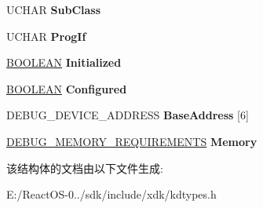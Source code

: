 \begin{DoxyCompactItemize}
U\+C\+H\+AR {\bfseries Sub\+Class}
\item 
\mbox{\label{struct___d_e_b_u_g___d_e_v_i_c_e___d_e_s_c_r_i_p_t_o_r_ad90b8ed3b5bef2c69a86db6abe697fc9}} 
U\+C\+H\+AR {\bfseries Prog\+If}
\item 
\mbox{\label{struct___d_e_b_u_g___d_e_v_i_c_e___d_e_s_c_r_i_p_t_o_r_a7b07c77ee8b0bcd4227bc0ee2f7e3794}} 
\hyperlink{_processor_bind_8h_a112e3146cb38b6ee95e64d85842e380a}{B\+O\+O\+L\+E\+AN} {\bfseries Initialized}
\item 
\mbox{\label{struct___d_e_b_u_g___d_e_v_i_c_e___d_e_s_c_r_i_p_t_o_r_a9e7e1296e2e8c233d2e46e487e4dddba}} 
\hyperlink{_processor_bind_8h_a112e3146cb38b6ee95e64d85842e380a}{B\+O\+O\+L\+E\+AN} {\bfseries Configured}
\item 
\mbox{\label{struct___d_e_b_u_g___d_e_v_i_c_e___d_e_s_c_r_i_p_t_o_r_a1c6511e706ee79120b2fc51ab1333335}} 
D\+E\+B\+U\+G\+\_\+\+D\+E\+V\+I\+C\+E\+\_\+\+A\+D\+D\+R\+E\+SS {\bfseries Base\+Address} \mbox{[}6\mbox{]}
\item 
\mbox{\label{struct___d_e_b_u_g___d_e_v_i_c_e___d_e_s_c_r_i_p_t_o_r_acc38f68a846534a799355c2edf4df2d9}} 
\hyperlink{struct___d_e_b_u_g___m_e_m_o_r_y___r_e_q_u_i_r_e_m_e_n_t_s}{D\+E\+B\+U\+G\+\_\+\+M\+E\+M\+O\+R\+Y\+\_\+\+R\+E\+Q\+U\+I\+R\+E\+M\+E\+N\+TS} {\bfseries Memory}
\end{DoxyCompactItemize}


该结构体的文档由以下文件生成\+:\begin{DoxyCompactItemize}
\item 
E\+:/\+React\+O\+S-\/0../sdk/include/xdk/kdtypes.\+h\end{DoxyCompactItemize}
